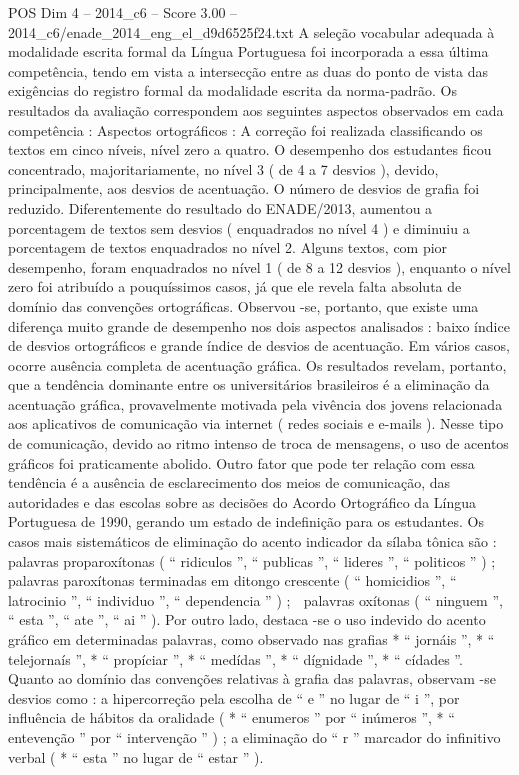 \begin{textsample}{POS Dim 4 – 2014\_c6 – Score 3.00 – 2014\_c6/enade\_2014\_eng\_el\_d9d6525f24.txt}
A seleção vocabular adequada à modalidade escrita formal da Língua Portuguesa foi incorporada a essa última competência, tendo em vista a intersecção entre as duas do ponto de vista das exigências do registro formal da modalidade escrita da norma-padrão.
Os resultados da avaliação correspondem aos seguintes aspectos observados em cada competência : Aspectos ortográficos : A correção foi realizada classificando os textos em cinco níveis, nível zero a quatro.
O desempenho dos estudantes ficou concentrado, majoritariamente, no nível 3 ( de 4 a 7 desvios ), devido, principalmente, aos desvios de acentuação.
O número de desvios de grafia foi reduzido.
Diferentemente do resultado do ENADE/2013, aumentou a porcentagem de textos sem desvios ( enquadrados no nível 4 ) e diminuiu a porcentagem de textos enquadrados no nível 2.
Alguns textos, com pior desempenho, foram enquadrados no nível 1 ( de 8 a 12 desvios ), enquanto o nível zero foi atribuído a pouquíssimos casos, já que ele revela falta absoluta de domínio das convenções ortográficas.
Observou -se, portanto, que existe uma diferença muito grande de desempenho nos dois aspectos analisados : baixo índice de desvios ortográficos e grande índice de desvios de acentuação.
Em vários casos, ocorre ausência completa de acentuação gráfica.
Os resultados revelam, portanto, que a tendência dominante entre os universitários brasileiros é a eliminação da acentuação gráfica, provavelmente motivada pela vivência dos jovens relacionada aos aplicativos de comunicação via internet ( redes sociais e e-mails ).
Nesse tipo de comunicação, devido ao ritmo intenso de troca de mensagens, o uso de acentos gráficos foi praticamente abolido.
Outro fator que pode ter relação com essa tendência é a ausência de esclarecimento dos meios de comunicação, das autoridades e das escolas sobre as decisões do Acordo Ortográfico da Língua Portuguesa de 1990, gerando um estado de indefinição para os estudantes.
Os casos mais sistemáticos de eliminação do acento indicador da sílaba tônica são :  palavras proparoxítonas ( “ ridiculos ”, “ publicas ”, “ lideres ”, “ politicos ” ) ;  palavras paroxítonas terminadas em ditongo crescente ( “ homicidios ”, “ latrocinio ”, “ individuo ”, “ dependencia ” ) ;  palavras oxítonas ( “ ninguem ”, “ esta ”, “ ate ”, “ ai ” ).
Por outro lado, destaca -se o uso indevido do acento gráfico em determinadas palavras, como observado nas grafias * “ jornáis ”, * “ telejornaís ”, * “ propíciar ”, * “ medídas ”, * “ dígnidade ”, * “ cídades ”.
Quanto ao domínio das convenções relativas à grafia das palavras, observam -se desvios como : a hipercorreção pela escolha de “ e ” no lugar de “ i ”, por influência de hábitos da oralidade ( * “ enumeros ” por “ inúmeros ”, * “ entevenção ” por “ intervenção ” ) ; a eliminação do “ r ” marcador do infinitivo verbal ( * “ esta ” no lugar de “ estar ” ).

\end{textsample}
